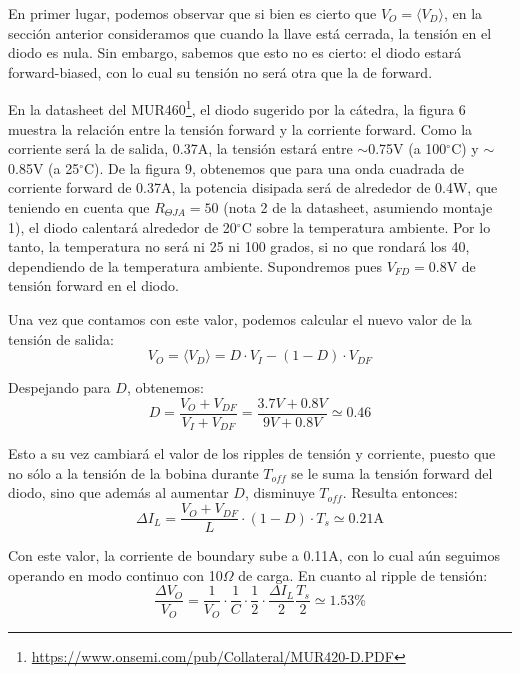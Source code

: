 \documentclass[e4_tp1_main.tex]{subfiles}
\begin{document}
En primer lugar, podemos observar que si bien es cierto que $V_O = \langle V_D \rangle$, en la secci\'on anterior consideramos que cuando la llave est\'a cerrada, la tensi\'on en el diodo es nula. Sin embargo, sabemos que esto no es cierto: el diodo estar\'a forward-biased, con lo cual su tensi\'on no ser\'a otra que la de forward. 

En la datasheet del 
MUR460\footnote{
	\url{https://www.onsemi.com/pub/Collateral/MUR420-D.PDF}
}, el diodo sugerido por la c\'atedra, la figura 6 muestra la relaci\'on entre la tensi\'on forward y la corriente forward. Como la corriente ser\'a la de salida, 0.37A, la tensi\'on estar\'a entre $\sim$0.75V (a 100$^\circ$C) y 
$\sim$0.85V (a 25$^\circ$C). 
De la figura 9, obtenemos que para una onda cuadrada de corriente forward de 0.37A, la potencia disipada ser\'a de alrededor de 0.4W, que teniendo en cuenta que $R_{\Theta JA}=50$ (nota 2 de la datasheet, asumiendo montaje 1), el diodo calentar\'a alrededor de 20$^\circ$C sobre la temperatura ambiente. Por lo tanto, la temperatura no ser\'a ni 25 ni 100 grados, si no que rondar\'a los 40, dependiendo de la temperatura ambiente. Supondremos pues $V_{FD}= 0.8$V de tensi\'on forward en el diodo.

Una vez que contamos con este valor, podemos calcular el nuevo valor de la tensi\'on de salida: 
\begin{equation}
	V_O = \langle V_D \rangle = D \cdot V_I - (1-D) \cdot V_{DF}   
\end{equation}

Despejando para $D$, obtenemos:
\begin{equation}
	D = \frac{V_O + V_{DF}}{V_I + V_{DF}} 
	= \frac{3.7V + 0.8V}{9V + 0.8V} 
	\simeq 0.46 
\end{equation}

Esto a su vez cambiar\'a el valor de los ripples de tensi\'on y corriente, puesto que no s\'olo a la tensi\'on de la bobina durante $T_{off}$ se le suma la tensi\'on forward del diodo, sino que adem\'as al aumentar $D$, disminuye $T_{off}$. Resulta entonces: 
\begin{equation}
	\Delta I_L = \frac{V_O + V_{DF}}{L} \cdot (1-D) \cdot T_s
	\simeq 0.21\text{A}
\end{equation} 

Con este valor, la corriente de boundary sube a 0.11A, con lo cual a\'un seguimos operando en modo continuo con 10$\Omega$ de carga. En cuanto al ripple de tensi\'on:
\begin{equation}
\frac{\Delta V_O}{V_O}  
= \frac{1}{V_O} 
\cdot \frac{1}{C} \cdot \frac{1}{2} \cdot \frac{\Delta I_L}{2} \frac{T_s}{2}
\simeq 1.53 \%
\label{eq:result-ripple-diodo}
\end{equation}
\end{document}
